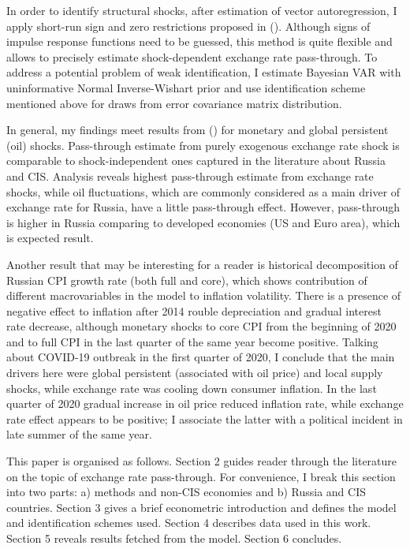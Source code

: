 \documentclass[12pt, a4paper]{extarticle}
\begin{document}
In order to identify structural shocks, after estimation of vector autoregression, I apply short-run sign and zero restrictions proposed in (\cite{Arias2014}). Although signs of impulse response functions need to be guessed, this method is quite flexible and allows to precisely estimate shock-dependent exchange rate pass-through. To address a potential problem of weak identification, I estimate Bayesian VAR with uninformative Normal Inverse-Wishart prior and use identification scheme mentioned above for draws from error covariance matrix distribution. 

In general, my findings meet results from (\cite{Khotulev2020}) for monetary and global persistent (oil) shocks. Pass-through estimate from purely exogenous exchange rate shock is comparable to shock-independent ones captured in the literature about Russia and CIS. Analysis reveals highest pass-through estimate from exchange rate shocks, while oil fluctuations, which are commonly considered as a main driver of exchange rate for Russia, have a little pass-through effect. However, pass-through is higher in Russia comparing to developed economies (US and Euro area), which is expected result.

Another result that may be interesting for a reader is historical decomposition of Russian CPI growth rate (both full and core), which shows contribution of different macrovariables in the model to inflation volatility. There is a presence of negative effect to inflation after 2014 rouble depreciation and gradual interest rate decrease, although monetary shocks to core CPI from the beginning of 2020 and to full CPI in the last quarter of the same year become positive. Talking about COVID-19 outbreak in the first quarter of 2020, I conclude that the main drivers here were global persistent (associated with oil price) and local supply shocks, while exchange rate was cooling down consumer inflation. In the last quarter of 2020 gradual increase in oil price reduced inflation rate, while exchange rate effect appears to be positive; I associate the latter with a political incident in late summer of the same year.

This paper is organised as follows. Section 2 guides reader through the literature on the topic of exchange rate pass-through. For convenience, I break this section into two parts: a) methods and non-CIS economies and b) Russia and CIS countries. Section 3 gives a brief econometric introduction and defines the model and identification schemes used. Section 4 describes data used in this work. Section 5 reveals results fetched from the model. Section 6 concludes.
\end{document}
